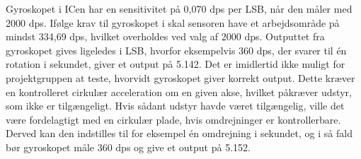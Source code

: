 Gyroskopet i ICen har en sensitivitet på 0,070 dps per LSB, når den måler med 2000 dps. Ifølge krav til gyroskopet i  skal sensoren have et arbejdsområde på mindst 334,69 dps, hvilket overholdes ved valg af 2000 dps. Outputtet fra gyroskopet gives ligeledes i LSB, hvorfor eksempelvis 360 dps, der svarer til én rotation i sekundet, giver et output på 5.142. Det er imidlertid ikke muligt for projektgruppen at teste, hvorvidt gyroskopet giver korrekt output. Dette kræver en kontrolleret cirkulær acceleration om en given akse, hvilket påkræver udstyr, som ikke er tilgængeligt. Hvis sådant udstyr havde været tilgængelig, ville det være fordelagtigt med en cirkulær plade, hvis omdrejninger er kontrollerbare. Derved kan den indstilles til for eksempel én omdrejning i sekundet, og i så fald bør gyroskopet måle 360 dps og give et output på 5.152.
%
%
%
